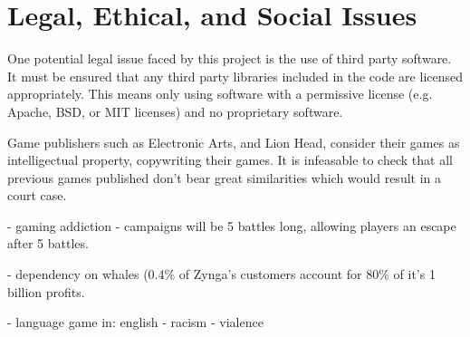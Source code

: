 \section{Legal, Ethical, and Social Issues}
\label{section:professional_issues}

One potential legal issue faced by this project is the use of third party software.
It must be ensured that any third party libraries included in the code are licensed
appropriately. This means only using software with a permissive license (e.g. Apache, BSD, or MIT licenses) and no proprietary software.

Game publishers such as Electronic Arts, and Lion Head, consider their games as intelligectual property, copywriting their games.
It is infeasable to check that all previous games published don't bear great similarities which would result in a court case.



- gaming addiction
  - campaigns will be 5 battles long, allowing players an escape after 5 battles.

- dependency on whales (0.4\% of Zynga's customers account for 80\% of it's  1 billion profits.



- language game in: english
- racism
- vialence



